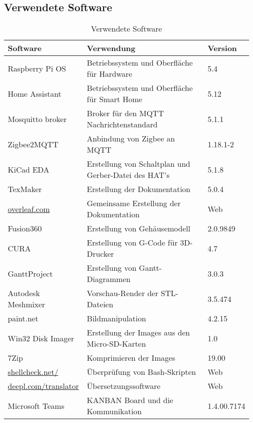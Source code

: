 \subsection{Verwendete Software}\label{qu_software}
\begin{table}[H]
\begin{tabularx}{\textwidth}{|p{5cm}|p{6cm}|p{3.2cm}|}
 	\hline 
 	\textbf{Software} & \textbf{Verwendung} & \textbf{Version} \\ 
 	\hline 
 	\hline
 	Raspberry Pi OS & Betriebssystem und Oberfläche für Hardware & 5.4 \\ 
 	\hline 
 	Home Assistant & Betriebssystem und Oberfläche für Smart Home & 5.12 \\ 
 	\hline
 	Mosquitto broker & Broker für den MQTT Nachrichtenstandard & 5.1.1 \\ 
 	\hline
 	Zigbee2MQTT & Anbindung von Zigbee an MQTT & 1.18.1-2 \\ 
 	\hline
 	KiCad EDA & Erstellung von Schaltplan und Gerber-Datei des HAT's & 5.1.8 \\ 
 	\hline 
 	TexMaker & Erstellung der Dokumentation & 5.0.4 \\ 
 	\hline
 	\url{overleaf.com } & Gemeinsame Erstellung der Dokumentation & Web \\
 	\hline
 	Fusion360 & Erstellung von Gehäusemodell & 2.0.9849 \\ 
 	\hline
 	CURA & Erstellung von G-Code für 3D-Drucker & 4.7 \\ 
 	\hline
 	GanttProject & Erstellung von Gantt-Diagrammen & 3.0.3 \\ 
 	\hline
 	Autodesk Meshmixer & Vorschau-Render der STL-Dateien & 3.5.474 \\
 	\hline
 	paint.net & Bildmanipulation & 4.2.15\\
 	\hline
 	Win32 Disk Imager & Erstellung der Images aus den Micro-SD-Karten & 1.0 \\
 	\hline
 	7Zip & Komprimieren der Images & 19.00\\
 	\hline
 	\url{shellcheck.net/} & Überprüfung von Bash-Skripten & Web \\
 	\hline
 	\url{deepl.com/translator} & Übersetzungssoftware & Web \\
 	\hline
 	Microsoft Teams & KANBAN Board und die Kommunikation & 1.4.00.7174 \\
 	\hline
\end{tabularx} 
\caption{Verwendete Software}
\label{tab:qu_software}
\end{table}